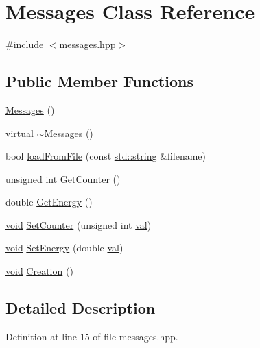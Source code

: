 \hypertarget{class_messages}{}\section{Messages Class Reference}
\label{class_messages}


{\ttfamily \#include $<$messages.\+hpp$>$}

\subsection*{Public Member Functions}
\begin{DoxyCompactItemize}
\item 
\mbox{\hyperlink{class_messages_abd3013dea54bfd87550739c3fa6e20d5}{Messages}} ()
\item 
virtual \mbox{\hyperlink{class_messages_ab0060ed5667e5dd2d47811df6c42d462}{$\sim$\+Messages}} ()
\item 
bool \mbox{\hyperlink{class_messages_a4263549c3f5c27b68279adbd7bcbcc30}{load\+From\+File}} (const \mbox{\hyperlink{glad_8h_ae84541b4f3d8e1ea24ec0f466a8c568b}{std\+::string}} \&filename)
\item 
unsigned int \mbox{\hyperlink{class_messages_a256f8190d9ef6e25db6a5030f9805b5d}{Get\+Counter}} ()
\item 
double \mbox{\hyperlink{class_messages_ab33cb49f408b16cf1fa29b5f141921c4}{Get\+Energy}} ()
\item 
\mbox{\hyperlink{glad_8h_a950fc91edb4504f62f1c577bf4727c29}{void}} \mbox{\hyperlink{class_messages_aecaad70bba58fd8d1a5640cb04088a2c}{Set\+Counter}} (unsigned int \mbox{\hyperlink{glad_8h_a26942fd2ed566ef553eae82d2c109c8f}{val}})
\item 
\mbox{\hyperlink{glad_8h_a950fc91edb4504f62f1c577bf4727c29}{void}} \mbox{\hyperlink{class_messages_a522996f78812e3a01e68214385db2cfd}{Set\+Energy}} (double \mbox{\hyperlink{glad_8h_a26942fd2ed566ef553eae82d2c109c8f}{val}})
\item 
\mbox{\hyperlink{glad_8h_a950fc91edb4504f62f1c577bf4727c29}{void}} \mbox{\hyperlink{class_messages_ac575287a8c19833d30480c5fb1769dfa}{Creation}} ()
\end{DoxyCompactItemize}


\subsection{Detailed Description}


Definition at line 15 of file messages.\+hpp.



